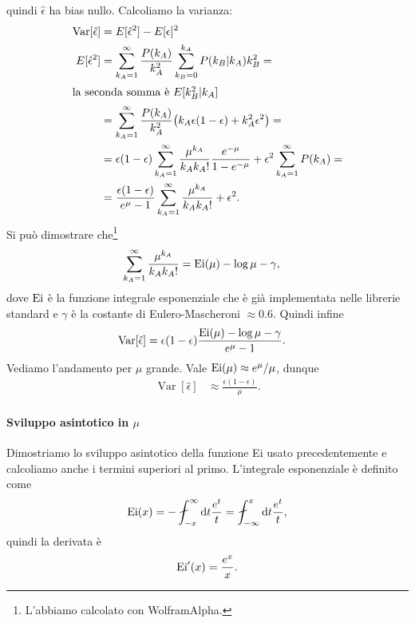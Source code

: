 quindi $\hat\epsilon$ ha bias nullo.
Calcoliamo la varianza:
\begin{align*}
	\operatorname{Var}[\hat\epsilon]
	&= E[\hat\epsilon^2] - E[\epsilon]^2 \\
	E[\hat\epsilon^2]
	&= \sum_{k_A=1}^\infty \frac{P(k_A)}{k_A^2}
	\sum_{k_B=0}^{k_A} P(k_B|k_A) k_B^2 = \\
	\intertext{la seconda somma è $E[k_B^2|k_A]$}
	&= \sum_{k_A=1}^\infty \frac{P(k_A)}{k_A^2}
	\big (k_A\epsilon(1-\epsilon) + k_A^2\epsilon^2 \big) = \\
	&= \epsilon(1-\epsilon) \sum_{k_A=1}^\infty \frac{\mu^{k_A}}{k_Ak_A!}\frac{e^{-\mu}}{1-e^{-\mu}}
	+ \epsilon^2 \sum_{k_A=1}^\infty P(k_A) = \\
	&= \frac{\epsilon(1-\epsilon)}{e^{\mu}-1} \sum_{k_A=1}^\infty \frac{\mu^{k_A}}{k_Ak_A!} + \epsilon^2.
\end{align*}
Si può dimostrare che\footnote{L'abbiamo calcolato con WolframAlpha.}
\begin{align*}
	\sum_{k_A=1}^\infty \frac{\mu^{k_A}}{k_Ak_A!}
	&= \operatorname{Ei}(\mu) - \log\mu - \gamma,
\end{align*}
dove $\operatorname{Ei}$ è la funzione integrale esponenziale che è già implementata nelle librerie standard
e $\gamma$ è la costante di Eulero-Mascheroni $\approx 0.6$.
Quindi infine
\begin{align*}
	\operatorname{Var}[\hat\epsilon]
	&= \epsilon(1-\epsilon)\frac{\operatorname{Ei}(\mu) - \log\mu - \gamma}{e^\mu - 1}.
\end{align*}
Vediamo l'andamento per $\mu$ grande.
Vale $\operatorname{Ei}(\mu) \approx e^{\mu}/\mu$, dunque
\begin{align*}
	\operatorname{Var}[\hat\epsilon]
	&\approx \frac{\epsilon(1-\epsilon)}{\mu}.
\end{align*}

\paragraph{Sviluppo asintotico in $\mu$}

Dimostriamo lo sviluppo asintotico della funzione Ei usato precedentemente
e calcoliamo anche i termini superiori al primo.
L'integrale esponenziale è definito come
\begin{equation*}
	\operatorname{Ei}(x)
	= - \fint_{-x}^\infty \de t \frac{e^t}t
	= \fint_{-\infty}^x \de t \frac{e^t}t,
\end{equation*}
quindi la derivata è
\begin{equation*}
	\operatorname{Ei}'(x) = \frac{e^x}x.
\end{equation*}

